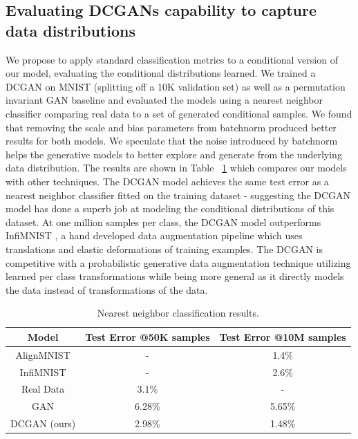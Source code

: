 \documentclass{article} %
\begin{document}
\subsection{Evaluating DCGANs capability to capture data distributions}

We propose to apply standard classification metrics to a conditional version of our model, evaluating the conditional distributions learned. We trained a DCGAN on MNIST (splitting off a 10K validation set) as well as a permutation invariant GAN baseline and evaluated the models using a nearest neighbor classifier comparing real data to a set of generated conditional samples. We found that removing the scale and bias parameters from batchnorm produced better results for both models. We speculate that the noise introduced by batchnorm helps the generative models to better explore and generate from the underlying data distribution. The results are shown in Table ~\ref{tab:nnc_mnist_results} which compares our models with other techniques. The DCGAN model achieves the same test error as a nearest neighbor classifier fitted on the training dataset - suggesting the DCGAN model has done a superb job at modeling the conditional distributions of this dataset. At one million samples per class, the DCGAN model outperforms InfiMNIST \citep{loosli-canu-bottou-2006}, a hand developed data augmentation pipeline which uses translations and elastic deformations of training examples. The DCGAN is competitive with a probabilistic generative data augmentation technique utilizing learned per class transformations \citep{Hauberg2015} while being more general as it directly models the data instead of transformations of the data.

\begin{table}[h]
\caption{Nearest neighbor classification results.}
\begin{center}
\begin{tabular}{ |c|c|c| }
    \hline
    \textbf{Model} & Test Error @50K samples & Test Error @10M samples\\
    \hline
    AlignMNIST & - & 1.4\% \\
    InfiMNIST & - & 2.6\% \\
    Real Data & 3.1\% & - \\
    GAN & 6.28\% & 5.65\% \\
    \hline
    DCGAN (ours) & 2.98\% & 1.48\% \\
    \hline
\end{tabular}
\end{center}
\label{tab:nnc_mnist_results}
\end{table}
\end{document}
